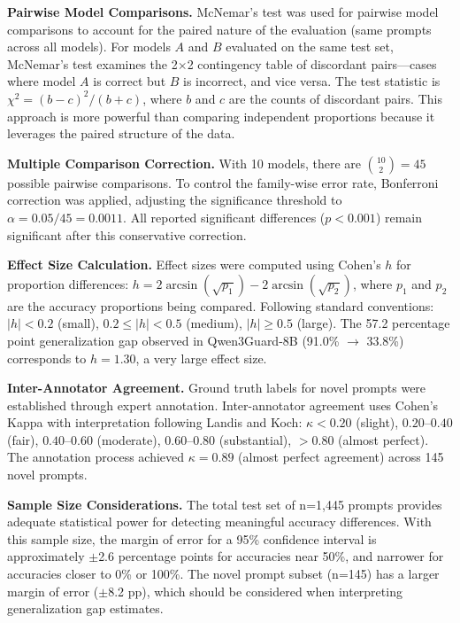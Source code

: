 \documentclass{article}
\begin{document}
\textbf{Pairwise Model Comparisons.} McNemar's test \cite{dietterich1998approximate} was used for pairwise model comparisons to account for the paired nature of the evaluation (same prompts across all models). For models $A$ and $B$ evaluated on the same test set, McNemar's test examines the 2$\times$2 contingency table of discordant pairs---cases where model $A$ is correct but $B$ is incorrect, and vice versa. The test statistic is $\chi^2 = (b - c)^2 / (b + c)$, where $b$ and $c$ are the counts of discordant pairs. This approach is more powerful than comparing independent proportions because it leverages the paired structure of the data.

\textbf{Multiple Comparison Correction.} With 10 models, there are $\binom{10}{2} = 45$ possible pairwise comparisons. To control the family-wise error rate, Bonferroni correction was applied, adjusting the significance threshold to $\alpha = 0.05/45 = 0.0011$. All reported significant differences ($p < 0.001$) remain significant after this conservative correction.

\textbf{Effect Size Calculation.} Effect sizes were computed using Cohen's $h$ \cite{cohen1988statistical} for proportion differences: $h = 2 \arcsin(\sqrt{p_1}) - 2 \arcsin(\sqrt{p_2})$, where $p_1$ and $p_2$ are the accuracy proportions being compared. Following standard conventions: $|h| < 0.2$ (small), $0.2 \leq |h| < 0.5$ (medium), $|h| \geq 0.5$ (large). The 57.2 percentage point generalization gap observed in Qwen3Guard-8B (91.0\% $\rightarrow$ 33.8\%) corresponds to $h = 1.30$, a very large effect size.

\textbf{Inter-Annotator Agreement.} Ground truth labels for novel prompts were established through expert annotation. Inter-annotator agreement uses Cohen's Kappa \cite{cohen1960coefficient} with interpretation following Landis and Koch: $\kappa < 0.20$ (slight), $0.20$--$0.40$ (fair), $0.40$--$0.60$ (moderate), $0.60$--$0.80$ (substantial), $> 0.80$ (almost perfect). The annotation process achieved $\kappa = 0.89$ (almost perfect agreement) across 145 novel prompts.

\textbf{Sample Size Considerations.} The total test set of n=1,445 prompts provides adequate statistical power for detecting meaningful accuracy differences. With this sample size, the margin of error for a 95\% confidence interval is approximately $\pm$2.6 percentage points for accuracies near 50\%, and narrower for accuracies closer to 0\% or 100\%. The novel prompt subset (n=145) has a larger margin of error ($\pm$8.2 pp), which should be considered when interpreting generalization gap estimates.
\end{document}
